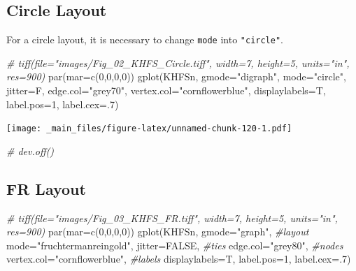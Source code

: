 \documentclass[
  notitlepage,
  onecolumn,
  openany]{book}
\newenvironment{Shaded}{\begin{snugshade}}{\end{snugshade}}
\newcommand{\AttributeTok}[1]{\textcolor[rgb]{0.77,0.63,0.00}{#1}}
\newcommand{\CommentTok}[1]{\textcolor[rgb]{0.56,0.35,0.01}{\textit{#1}}}
\newcommand{\ConstantTok}[1]{\textcolor[rgb]{0.00,0.00,0.00}{#1}}
\newcommand{\DecValTok}[1]{\textcolor[rgb]{0.00,0.00,0.81}{#1}}
\newcommand{\FunctionTok}[1]{\textcolor[rgb]{0.00,0.00,0.00}{#1}}
\newcommand{\NormalTok}[1]{#1}
\newcommand{\StringTok}[1]{\textcolor[rgb]{0.31,0.60,0.02}{#1}}
\begin{document}
\hypertarget{circle-layout}{%
\subsection{Circle Layout}\label{circle-layout}}

For a circle layout, it is necessary to change \texttt{mode} into \texttt{"circle"}.

\begin{Shaded}
\begin{Highlighting}[]
\CommentTok{\# tiff(file="images/Fig\_02\_KHFS\_Circle.tiff", width=7, height=5, units="in", res=900)}
\FunctionTok{par}\NormalTok{(}\AttributeTok{mar=}\FunctionTok{c}\NormalTok{(}\DecValTok{0}\NormalTok{,}\DecValTok{0}\NormalTok{,}\DecValTok{0}\NormalTok{,}\DecValTok{0}\NormalTok{))}
\FunctionTok{gplot}\NormalTok{(KHFSn, }
      \AttributeTok{gmode=}\StringTok{"digraph"}\NormalTok{,}
      \AttributeTok{mode=}\StringTok{"circle"}\NormalTok{,}
      \AttributeTok{jitter=}\NormalTok{F,}
      \AttributeTok{edge.col=}\StringTok{"grey70"}\NormalTok{,}
      \AttributeTok{vertex.col=}\StringTok{"cornflowerblue"}\NormalTok{,}
      \AttributeTok{displaylabels=}\NormalTok{T,}
      \AttributeTok{label.pos=}\DecValTok{1}\NormalTok{,}
      \AttributeTok{label.cex=}\NormalTok{.}\DecValTok{7}\NormalTok{)}
\end{Highlighting}
\end{Shaded}

\texttt{[image: \_main\_files/figure-latex/unnamed-chunk-120-1.pdf]}

\begin{Shaded}
\begin{Highlighting}[]
\CommentTok{\# dev.off()}
\end{Highlighting}
\end{Shaded}

\hypertarget{fr-layout}{%
\subsection{FR Layout}\label{fr-layout}}

\begin{Shaded}
\begin{Highlighting}[]
\CommentTok{\# tiff(file="images/Fig\_03\_KHFS\_FR.tiff", width=7, height=5, units="in", res=900)}
\FunctionTok{par}\NormalTok{(}\AttributeTok{mar=}\FunctionTok{c}\NormalTok{(}\DecValTok{0}\NormalTok{,}\DecValTok{0}\NormalTok{,}\DecValTok{0}\NormalTok{,}\DecValTok{0}\NormalTok{))}
\FunctionTok{gplot}\NormalTok{(KHFSn, }
      \AttributeTok{gmode=}\StringTok{"graph"}\NormalTok{,}
      \CommentTok{\#layout}
      \AttributeTok{mode=}\StringTok{"fruchtermanreingold"}\NormalTok{,}
      \AttributeTok{jitter=}\ConstantTok{FALSE}\NormalTok{,}
      \CommentTok{\#ties}
      \AttributeTok{edge.col=}\StringTok{"grey80"}\NormalTok{,}
      \CommentTok{\#nodes}
      \AttributeTok{vertex.col=}\StringTok{"cornflowerblue"}\NormalTok{,}
      \CommentTok{\#labels}
      \AttributeTok{displaylabels=}\NormalTok{T,}
      \AttributeTok{label.pos=}\DecValTok{1}\NormalTok{,}
      \AttributeTok{label.cex=}\NormalTok{.}\DecValTok{7}\NormalTok{)}
\end{Highlighting}
\end{Shaded}
\end{document}
